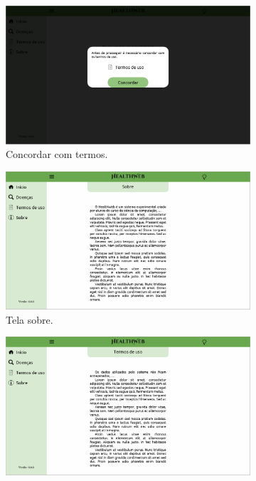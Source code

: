 \begin{figure}[htbp]
	\centering
	\begin{subfigure}{0.49\linewidth}
		\centering
		\includegraphics[width=\linewidth]{figure/prototype/desktop/agreeing.png}
		\caption{Concordar com termos.}
		\label{fig:desktop:agreeing}
	\end{subfigure}
	\hfill
	\begin{subfigure}{0.49\linewidth}
		\centering
		\includegraphics[width=\linewidth]{figure/prototype/desktop/about.png}
		\caption{Tela sobre.}
		\label{fig:desktop:about}
	\end{subfigure}
	\hfill
	\begin{subfigure}{0.49\linewidth}
		\centering
		\includegraphics[width=\linewidth]{figure/prototype/desktop/terms.png}

\end{subfigure}
\end{figure}
